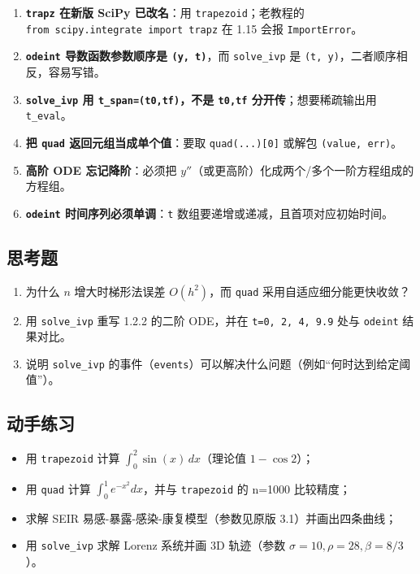 \begin{enumerate}
\def\labelenumi{\arabic{enumi}.}
\tightlist
\item
  \textbf{\texttt{trapz} 在新版 SciPy 已改名}：用
  \texttt{trapezoid}；老教程的
  \texttt{from\ scipy.integrate\ import\ trapz} 在 1.15 会报
  \texttt{ImportError}。
\item
  \textbf{\texttt{odeint} 导数函数参数顺序是 \texttt{(y,\ t)}}，而
  \texttt{solve\_ivp} 是 \texttt{(t,\ y)}，二者顺序相反，容易写错。
\item
  \textbf{\texttt{solve\_ivp} 用 \texttt{t\_span=(t0,tf)}，不是
  \texttt{t0,tf} 分开传}；想要稀疏输出用 \texttt{t\_eval}。
\item
  \textbf{把 \texttt{quad} 返回元组当成单个值}：要取
  \texttt{quad(...){[}0{]}} 或解包 \texttt{(value,\ err)}。
\item
  \textbf{高阶 ODE 忘记降阶}：必须把
  \(y''\)（或更高阶）化成两个/多个一阶方程组成的方程组。
\item
  \textbf{\texttt{odeint} 时间序列必须单调}：\texttt{t}
  数组要递增或递减，且首项对应初始时间。
\end{enumerate}

\subsection{思考题}\label{ux601dux8003ux9898-9}

\begin{enumerate}
\def\labelenumi{\arabic{enumi}.}
\tightlist
\item
  为什么 \(n\) 增大时梯形法误差 \(O(h^2)\)，而 \texttt{quad}
  采用自适应细分能更快收敛？
\item
  用 \texttt{solve\_ivp} 重写 1.2.2 的二阶 ODE，并在
  \texttt{t=0,\ 2,\ 4,\ 9.9} 处与 \texttt{odeint} 结果对比。
\item
  说明 \texttt{solve\_ivp}
  的事件（\texttt{events}）可以解决什么问题（例如``何时达到给定阈值''）。
\end{enumerate}

\subsection{动手练习}\label{ux52a8ux624bux7ec3ux4e60}

\begin{itemize}
\tightlist
\item
  用 \texttt{trapezoid} 计算 \(\int_0^2 \sin(x)\,dx\)（理论值
  \(1-\cos2\)）；
\item
  用 \texttt{quad} 计算 \(\int_0^1 e^{-x^2}dx\)，并与 \texttt{trapezoid}
  的 n=1000 比较精度；
\item
  求解 SEIR 易感-暴露-感染-康复模型（参数见原版 3.1）并画出四条曲线；
\item
  用 \texttt{solve\_ivp} 求解 Lorenz 系统并画 3D 轨迹（参数
  \(\sigma=10,\rho=28,\beta=8/3\)）。
\end{itemize}


